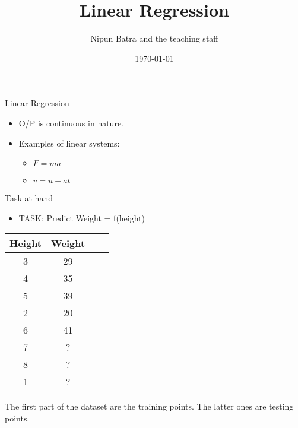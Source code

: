 \documentclass{beamer}
\title{Linear Regression}
\date{\today}
\author{Nipun Batra and the teaching staff}
\institute{IIT Gandhinagar}
\begin{document}
  \maketitle
  
  
  

\begin{frame}{Linear Regression}
\begin{itemize}
	
	
	\item<+-> O/P is continuous in nature.
	\item<+-> Examples of linear systems:
	\begin{itemize}
		\item<+-> $F=ma$
		\item<+-> $v=u+at$
	\end{itemize}
	
\end{itemize}
\end{frame}

\begin{frame}{Task at hand}
\begin{itemize}

\item TASK: Predict Weight = f(height)
\end{itemize}
\begin{center}
    

\begin{tabular}{ |c|c|c|c| } 
\hline
 Height & Weight \\
\hline
3 & 29 \\ 
4 & 35 \\ 
5 & 39\\
2 & 20\\
6 & 41\\
\hline
\hline
7 & ?\\
8 & ?\\
1 &? \\
\hline
\end{tabular}

\end{center}
The first part of the dataset are the training points. The latter ones are testing points.	

\end{frame}
\end{document}
